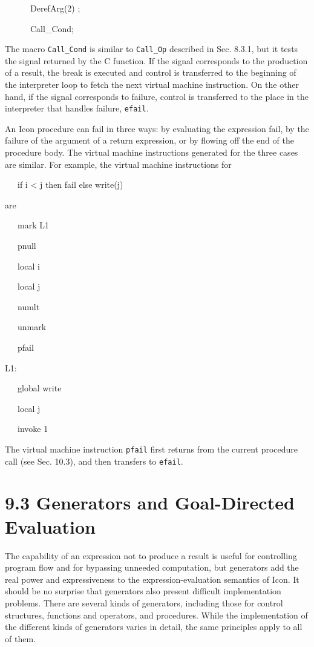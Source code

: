 {\ttfamily\mdseries
\ \ \ \ \ \ DerefArg(2) ;}

{\ttfamily\mdseries
\ \ \ \ \ \ Call\_Cond;}


The macro \texttt{Call\_Cond} is similar to \texttt{Call\_Op}
described in Sec. 8.3.1, but it tests the signal returned by the C
function. If the signal corresponds to the production of a result, the
break is executed and control is transferred to the beginning of the
interpreter loop to fetch the next virtual machine instruction. On the
other hand, if the signal corresponds to failure, control is
transferred to the place in the interpreter that handles failure,
\texttt{efail}.


An Icon procedure can fail in three ways: by evaluating the expression
fail, by the failure of the argument of a return expression, or by
flowing off the end of the procedure body. The virtual machine
instructions generated for the three cases are similar. For example,
the virtual machine instructions for

{\ttfamily\mdseries
\ \ \ if i {\textless} j then fail else write(j)}


are

{\ttfamily\mdseries
\ \ \ mark L1}

{\ttfamily\mdseries
\ \ \ pnull}

{\ttfamily\mdseries
\ \ \ local i}

{\ttfamily\mdseries
\ \ \ local j}

{\ttfamily\mdseries
\ \ \ numlt}

{\ttfamily\mdseries
\ \ \ unmark}

{\ttfamily\mdseries
\ \ \ pfail}

{\ttfamily\mdseries
L1:}

{\ttfamily\mdseries
\ \ \ global write}

{\ttfamily\mdseries
\ \ \ local j}

{\ttfamily\mdseries
\ \ \ invoke 1}

The virtual machine instruction \texttt{pfail} first returns from the
current procedure call (see Sec. 10.3), and then transfers to
\texttt{efail}.


\section[9.3 Generators and Goal{}-Directed Evaluation]{9.3 Generators and Goal-Directed Evaluation}

The capability of an expression not to produce a result is useful for
controlling program flow and for bypassing unneeded computation, but
generators add the real power and expressiveness to the
expression-evaluation semantics of Icon. It should be no surprise that
generators also present difficult implementation problems. There are
several kinds of generators, including those for control structures,
functions and operators, and procedures. While the implementation of
the different kinds of generators varies in detail, the same
principles apply to all of them.


